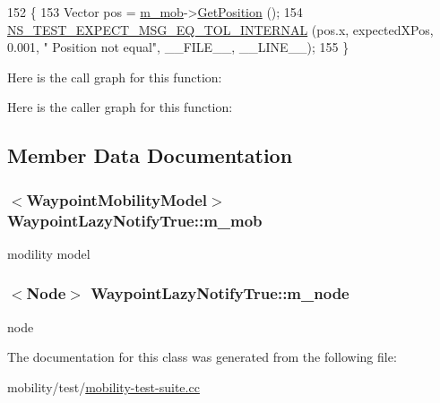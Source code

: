 \begin{DoxyCode}
152 \{
153   Vector pos = \hyperlink{classWaypointLazyNotifyTrue_a60b0cfeb0410f5c4bdbda3acb26286bb}{m\_mob}->\hyperlink{classns3_1_1MobilityModel_aba838f06ec5bbb2d193d94b8c0e4abb4}{GetPosition} ();
154   \hyperlink{group__testingimpl_ga831cf7f3b988d2759f9c1b72f0a1bd5c}{NS\_TEST\_EXPECT\_MSG\_EQ\_TOL\_INTERNAL} (pos.x, expectedXPos, 0.001, \textcolor{stringliteral}{"
      Position not equal"}, \_\_FILE\_\_, \_\_LINE\_\_);
155 \}
\end{DoxyCode}


Here is the call graph for this function\+:




Here is the caller graph for this function\+:




\subsection{Member Data Documentation}
\subsubsection[{\texorpdfstring{m\+\_\+mob}{m_mob}}]{$<${\bf Waypoint\+Mobility\+Model}$>$ Waypoint\+Lazy\+Notify\+True\+::m\+\_\+mob\hspace{0.3cm}{\ttfamily [private]}}\hypertarget{classWaypointLazyNotifyTrue_a60b0cfeb0410f5c4bdbda3acb26286bb}{}\label{classWaypointLazyNotifyTrue_a60b0cfeb0410f5c4bdbda3acb26286bb}


modility model 

\subsubsection[{\texorpdfstring{m\+\_\+node}{m_node}}]{$<${\bf Node}$>$ Waypoint\+Lazy\+Notify\+True\+::m\+\_\+node\hspace{0.3cm}{\ttfamily [private]}}\hypertarget{classWaypointLazyNotifyTrue_a54cfff8e5ad0cf1fabec889033c4c766}{}\label{classWaypointLazyNotifyTrue_a54cfff8e5ad0cf1fabec889033c4c766}


node 



The documentation for this class was generated from the following file\+:\begin{DoxyCompactItemize}
\item 
mobility/test/\hyperlink{mobility-test-suite_8cc}{mobility-\/test-\/suite.\+cc}\end{DoxyCompactItemize}
